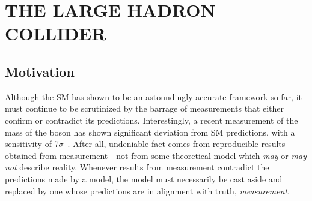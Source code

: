 \chapter{THE LARGE HADRON COLLIDER}
\label{ch:lhc}

\section{Motivation}
Although the SM
has shown to be an astoundingly accurate framework so far, it must continue to be scrutinized by the barrage of measurements that either confirm or contradict its predictions.
Interestingly, a recent measurement of the mass of the \PW boson has shown significant deviation from SM predictions, with a sensitivity of 7$\sigma$~\cite{cdf_collaboration_high-precision_2022}.
After all, undeniable fact comes from reproducible results obtained from measurement---not from some theoretical model which \emph{may} or \emph{may not} describe reality.
Whenever results from measurement contradict the predictions made by a model, the model must necessarily be cast aside and replaced by one whose predictions are in alignment with truth, \ie \emph{measurement}.

